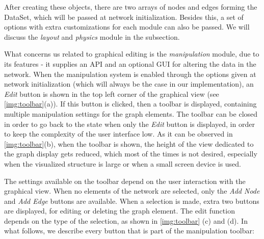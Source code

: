 After creating these objects, there are two arrays of nodes and edges forming the DataSet, which will be passed at network initialization. Besides this, a set of options with extra customizations for each module can also be passed. We will discuss the \textit{layout} and \textit{physics} module in the  subsection. 

What concerns us related to graphical editing is the \textit{manipulation} module, due to its features - it supplies an API and an optional GUI for altering the data in the network. When the manipulation system is enabled through the options given at network initialization (which will always be the case in our implementation), an \textit{Edit} button is shown in the top left corner of the graphical view (see \autoref{img:toolbar}(a)). If this button is clicked, then a toolbar is displayed, containing multiple manipulation settings for the graph elements. The toolbar can be closed in order to go back to the state when only the \textit{Edit} button is displayed, in order to keep the complexity of the user interface low. As it can be observed in \autoref{img:toolbar}(b), when the toolbar is shown, the height of the view dedicated to the graph display gets reduced, which most of the times is not desired, especially when the visualized structure is large or when a small screen device is used.

The settings available on the toolbar depend on the user interaction with the graphical view. When no elements of the network are selected, only the \textit{Add Node} and \textit{Add Edge} buttons are available. When a selection is made, extra two buttons are displayed, for editing or deleting the graph element. The edit function depends on the type of the selection, as shown in \autoref{img:toolbar} (c) and (d). In what follows, we describe every button that is part of the manipulation toolbar:

